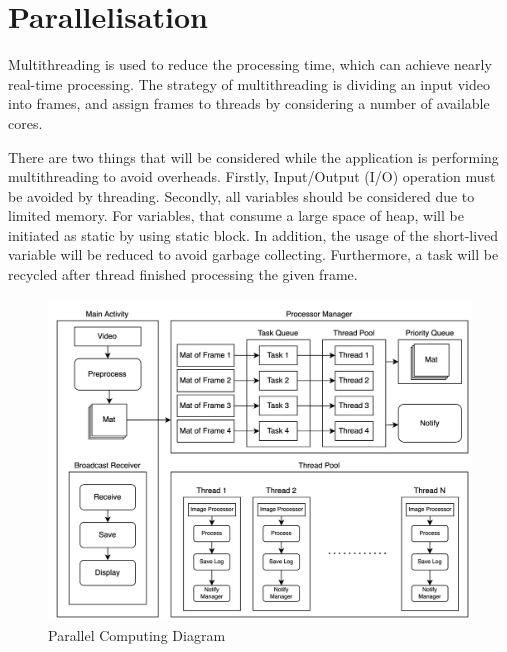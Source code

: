     \section{Parallelisation}
        Multithreading is used to reduce the processing time, which can achieve nearly real-time processing.
        The strategy of multithreading is dividing an input video into frames,
        and assign frames to threads by considering a number of available cores.

         There are two things that will be considered while the application is performing multithreading to avoid overheads.
        Firstly, Input/Output (I/O) operation must be avoided by threading.
        Secondly, all variables should be considered due to limited memory.
            For variables, that consume a large space of heap, will be initiated as static by using static block.
            In addition, the usage of the short-lived variable will be reduced to avoid garbage collecting.
            Furthermore, a task will be recycled after thread finished processing the given frame.

        \begin{figure}[!ht]
            \includegraphics[width=6in]{images/chapter3/parallel.png}
            \caption{Parallel Computing Diagram}
            \label{parallelJava}
        \end{figure}

